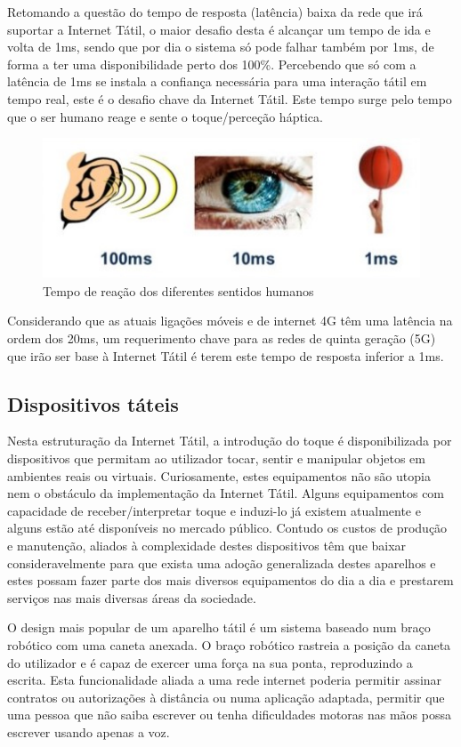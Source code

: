 \documentclass{llncs}
\begin{document}
Retomando a questão do tempo de resposta (latência) baixa da rede que irá suportar a Internet Tátil, o maior desafio desta é alcançar um tempo de ida e volta de 1ms, sendo que por dia o sistema só pode falhar também por 1ms, de forma a ter uma disponibilidade perto dos 100\%. Percebendo que só com a latência de 1ms se instala a confiança necessária para uma interação tátil em tempo real, este é o desafio chave da Internet Tátil. Este tempo surge pelo tempo que o ser humano reage e sente o toque/perceção háptica.

\begin{figure}[!h]
\centering
\includegraphics[scale=0.9]{imagem2.jpg}
\caption{Tempo de reação dos diferentes sentidos humanos ~\cite{Artigo2}}
\label{Rotulo}
\end{figure}

Considerando que as atuais ligações móveis e de internet 4G têm uma latência na ordem dos 20ms, um requerimento chave para as redes de quinta geração (5G) que irão ser base à Internet Tátil é terem este tempo de resposta inferior a 1ms.

\subsection{Dispositivos táteis}
\setlength{\parindent}{0.5cm}
Nesta estruturação da Internet Tátil, a introdução do toque é disponibilizada por dispositivos que permitam ao utilizador tocar, sentir e manipular objetos em ambientes reais ou virtuais. Curiosamente, estes equipamentos não são utopia nem o obstáculo da implementação da Internet Tátil. Alguns equipamentos com capacidade de receber/interpretar toque e induzi-lo já existem atualmente e alguns estão até disponíveis no mercado público. Contudo os custos de produção e manutenção, aliados à complexidade destes dispositivos têm que baixar consideravelmente para que exista uma adoção generalizada destes aparelhos e estes possam fazer parte dos mais diversos equipamentos do dia a dia e prestarem serviços nas mais diversas áreas da sociedade.

O design mais popular de um aparelho tátil é um sistema baseado num braço robótico com uma caneta anexada. O braço robótico rastreia a posição da caneta do utilizador e é capaz de exercer uma força na sua ponta, reproduzindo a escrita. Esta funcionalidade aliada a uma rede internet poderia permitir assinar contratos ou autorizações à distância ou numa aplicação adaptada, permitir que uma pessoa que não saiba escrever ou tenha dificuldades motoras nas mãos possa escrever usando apenas a voz.
\end{document}

